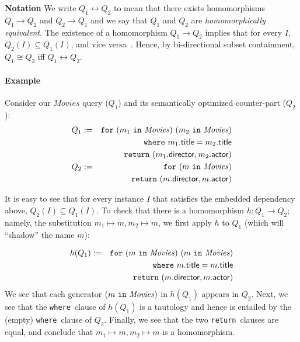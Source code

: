 \documentclass[preprint]{sigplanconf}
\newcommand{\FOR}{{\tt for}\relax\ifmmode\ \else\xspace\fi}
\newcommand{\WHERE}{{\tt where}\relax\ifmmode\ \else\xspace\fi}
\newcommand{\IN}{ \ {\tt in} \ }
\newcommand{\RETURN}{{\tt return}\relax\ifmmode\ \else\xspace\fi}
\newcommand{\greg}[1]{\textcolor{blue}{GREG: #1}}
\newcommand{\relation}[1]{\ensuremath{\mathit{#1}}\xspace}
\begin{document}
{\bf Notation} We write $Q_1 \leftrightarrow Q_2$ to mean that there exists homomorphisms $Q_1 \to Q_2$ and $Q_2 \to Q_1$ and we say that $Q_1$ and $Q_2$ are {\it homomorphically equivalent}.  The existence of a homomorphism $Q_1 \to Q_2$ implies that for every $I$, $Q_2(I) \subseteq Q_1(I)$, and vice versa~\cite{foundations}.  Hence, by bi-directional subset containment, $Q_1 \cong Q_2$ iff $Q_1 \leftrightarrow Q_2$.

\paragraph{Example} Consider our \relation{Movies} query ($Q_1$) and its semantically optimized counter-part ($Q_2$):
\begin{eqnarray*}
Q_1 & := & \FOR (m_1 \IN \relation{Movies}) \ (m_2 \IN \relation{Movies}) \\
 & & \WHERE m_1.{\sf title} = m_2.{\sf title} \\
 & & \RETURN (m_1.{\sf director}, m_2.{\sf actor}) \\
Q_2 & := & \FOR (m \IN \relation{Movies}) \\
 & & \RETURN (m.{\sf director}, m.{\sf actor})
\end{eqnarray*}   

It is easy to see that for every instance $I$ that satisfies the embedded dependency above, $Q_2(I) \subseteq Q_1(I)$. 
To check that there is a homomorphism $h : Q_1 \to Q_2$; namely, the substitution $m_1 \mapsto m, m_2 \mapsto m$,
 we first apply $h$ to $Q_1$ (which will ``shadow'' the name $m$):

\begin{eqnarray*}
h(Q_1) & := & \FOR (m \IN \relation{Movies}) \ (m \IN \relation{Movies}) \\
 & & \WHERE m.{\sf title} = m.{\sf title} \\
 & & \RETURN (m.{\sf director}, m.{\sf actor})
\end{eqnarray*}   
We see that each generator $(m \IN \relation{Movies})$ in $h(Q_1)$ appears in $Q_2$.
Next, we see that the \WHERE clause of $h(Q_1)$ is a tautology and hence is entailed by the (empty) \WHERE clause of $Q_2$.
Finally, we see that the two \RETURN clauses are equal, and conclude that $m_1 \mapsto m, m_2 \mapsto m$ is a homomorphism.
\end{document}
